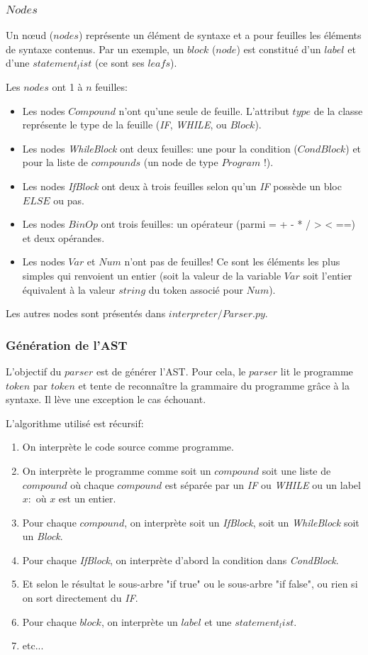 \documentclass[a4paper]{article}
\begin{document}
\subsubsection{$Nodes$}

Un nœud ($nodes$) représente un élément de syntaxe et a pour feuilles les éléments de syntaxe contenus. Par un exemple, un $block$ ($node$) est constitué d'un $label$ et d'une $statement_list$ (ce sont ses $leafs$). 

Les $nodes$ ont 1 à $n$ feuilles:
\begin{itemize}
\item Les nodes $Compound$ n'ont qu'une seule de feuille. L'attribut $type$ de la classe représente le type de la feuille (\textit{IF}, \textit{WHILE}, ou $Block$). 
\item Les nodes \textit{WhileBlock} ont deux feuilles: une pour la condition ($CondBlock$) et pour la liste de $compounds$ (un node de type $Program$ !).
\item Les nodes \textit{IfBlock} ont deux à trois feuilles selon qu'un \textit{IF} possède un bloc $ELSE$ ou pas. 
\item Les nodes $BinOp$ ont trois feuilles: un opérateur (parmi = + - * / > < ==) et deux opérandes. 
\item Les nodes $Var$ et $Num$ n'ont pas de feuilles! Ce sont les éléments les plus simples qui renvoient un entier (soit la valeur de la variable $Var$ soit l'entier équivalent à la valeur $string$ du token associé pour $Num$). 
\end{itemize}

Les autres nodes sont présentés dans $interpreter/Parser.py$. 

\subsubsection{Génération de l'AST}

L'objectif du $parser$ est de générer l'AST. Pour cela, le $parser$ lit le programme $token$ par $token$ et tente de reconnaître la grammaire du programme grâce à la syntaxe. Il lève une exception le cas échouant. 

L'algorithme utilisé est récursif: 
\begin{enumerate}
\item On interprète le code source comme programme.
\item On interprète le programme comme soit un $compound$ soit une liste de $compound$ où chaque $compound$ est séparée par un \textit{IF} ou \textit{WHILE} ou un label $x:$ où $x$ est un entier. 
\item Pour chaque $compound$, on interprète soit un \textit{IfBlock}, soit un \textit{WhileBlock} soit un \textit{Block}.
\item Pour chaque \textit{IfBlock}, on interprète d'abord la condition dans \textit{CondBlock}.
\item Et selon le résultat le sous-arbre "if true" ou le sous-arbre "if false", ou rien si on sort directement du \textit{IF}.
\item Pour chaque $block$, on interprète un $label$ et une $statement_list$.
\item etc...
\end{enumerate}
\end{document}
